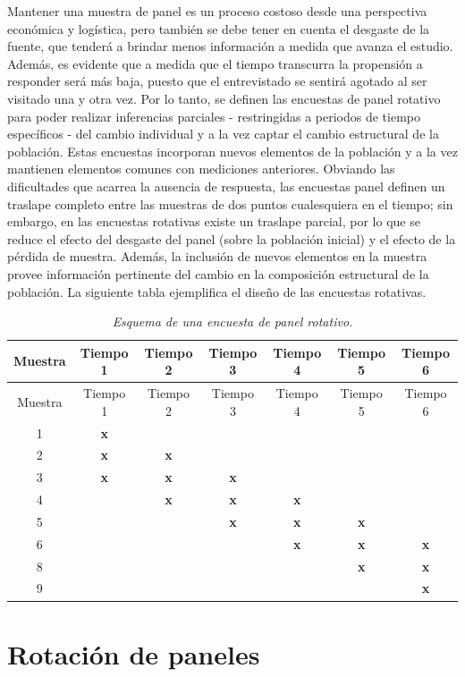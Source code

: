 \documentclass[
  10pt,
  spanish,
]{book}
\begin{document}
Mantener una muestra de panel es un proceso costoso desde una perspectiva económica y logística, pero también se debe tener en cuenta el desgaste de la fuente, que tenderá a brindar menos información a medida que avanza el estudio. Además, es evidente que a medida que el tiempo transcurra la propensión a responder será más baja, puesto que el entrevistado se sentirá agotado al ser visitado una y otra vez. Por lo tanto, se definen las encuestas de panel rotativo para poder realizar inferencias parciales - restringidas a periodos de tiempo específicos - del cambio individual y a la vez captar el cambio estructural de la población. Estas encuestas incorporan nuevos elementos de la población y a la vez mantienen elementos comunes con mediciones anteriores. Obviando las dificultades que acarrea la ausencia de respuesta, las encuestas panel definen un traslape completo entre las muestras de dos puntos cualesquiera en el tiempo; sin embargo, en las encuestas rotativas existe un traslape parcial, por lo que se reduce el efecto del desgaste del panel (sobre la población inicial) y el efecto de la pérdida de muestra. Además, la inclusión de nuevos elementos en la muestra provee información pertinente del cambio en la composición estructural de la población. La siguiente tabla ejemplifica el diseño de las encuestas rotativas.

\begin{longtable}[]{@{}ccccccc@{}}
\caption{\emph{Esquema de una encuesta de panel rotativo.}}\tabularnewline
\toprule
Muestra & Tiempo 1 & Tiempo 2 & Tiempo 3 & Tiempo 4 & Tiempo 5 & Tiempo 6 \\
\midrule
\endfirsthead
\toprule
Muestra & Tiempo 1 & Tiempo 2 & Tiempo 3 & Tiempo 4 & Tiempo 5 & Tiempo 6 \\
\midrule
\endhead
1 & \textbf{x} & & & & & \\
2 & \textbf{x} & \textbf{x} & & & & \\
3 & \textbf{x} & \textbf{x} & \textbf{x} & & & \\
4 & & \textbf{x} & \textbf{x} & \textbf{x} & & \\
5 & & & \textbf{x} & \textbf{x} & \textbf{x} & \\
6 & & & & \textbf{x} & \textbf{x} & \textbf{x} \\
8 & & & & & \textbf{x} & \textbf{x} \\
9 & & & & & & \textbf{x} \\
\bottomrule
\end{longtable}

\hypertarget{rotaciuxf3n-de-paneles}{%
\section{Rotación de paneles}\label{rotaciuxf3n-de-paneles}}
\end{document}
